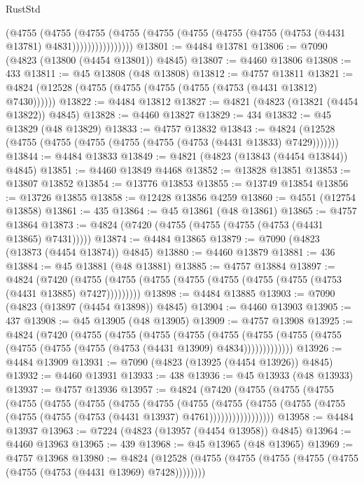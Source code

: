 \begin{lexlean}{RustStd}
\begin{coremodule}
                  (@4755
                    (@4755
                      (@4755
                        (@4755
                          (@4755 (@4755 (@4755 (@4755 (@4753 (@4431 @13781) @4831))))))))))))))))
@13801 := @4484 @13781
@13806 := @7090 (@4823 (@13800 (@4454 @13801)) @4845)
@13807 := @4460 @13806
@13808 := 433
@13811 := @45 @13808 (@48 @13808)
@13812 := @4757 @13811
@13821 := @4824 (@12528 (@4755 (@4755 (@4755 (@4755 (@4753 (@4431 @13812) @7430))))))
@13822 := @4484 @13812
@13827 := @4821 (@4823 (@13821 (@4454 @13822)) @4845)
@13828 := @4460 @13827
@13829 := 434
@13832 := @45 @13829 (@48 @13829)
@13833 := @4757 @13832
@13843 := @4824 (@12528 (@4755 (@4755 (@4755 (@4755 (@4755 (@4753 (@4431 @13833) @7429)))))))
@13844 := @4484 @13833
@13849 := @4821 (@4823 (@13843 (@4454 @13844)) @4845)
@13851 := @4460 @13849 @4468
@13852 := @13828 @13851
@13853 := @13807 @13852
@13854 := @13776 @13853
@13855 := @13749 @13854
@13856 := @13726 @13855
@13858 := @12428 @13856 @4259
@13860 := @4551 (@12754 @13858)
@13861 := 435
@13864 := @45 @13861 (@48 @13861)
@13865 := @4757 @13864
@13873 := @4824 (@7420 (@4755 (@4755 (@4755 (@4753 (@4431 @13865) @7431)))))
@13874 := @4484 @13865
@13879 := @7090 (@4823 (@13873 (@4454 @13874)) @4845)
@13880 := @4460 @13879
@13881 := 436
@13884 := @45 @13881 (@48 @13881)
@13885 := @4757 @13884
@13897 := @4824
    (@7420 (@4755 (@4755 (@4755 (@4755 (@4755 (@4755 (@4755 (@4753 (@4431 @13885) @7427)))))))))
@13898 := @4484 @13885
@13903 := @7090 (@4823 (@13897 (@4454 @13898)) @4845)
@13904 := @4460 @13903
@13905 := 437
@13908 := @45 @13905 (@48 @13905)
@13909 := @4757 @13908
@13925 := @4824
    (@7420
      (@4755
        (@4755
          (@4755
            (@4755
              (@4755
                (@4755 (@4755 (@4755 (@4755 (@4755 (@4755 (@4753 (@4431 @13909) @4834)))))))))))))
@13926 := @4484 @13909
@13931 := @7090 (@4823 (@13925 (@4454 @13926)) @4845)
@13932 := @4460 @13931
@13933 := 438
@13936 := @45 @13933 (@48 @13933)
@13937 := @4757 @13936
@13957 := @4824
    (@7420
      (@4755
        (@4755
          (@4755
            (@4755
              (@4755
                (@4755
                  (@4755
                    (@4755
                      (@4755
                        (@4755
                          (@4755
                            (@4755 (@4755 (@4755 (@4755 (@4753 (@4431 @13937) @4761)))))))))))))))))
@13958 := @4484 @13937
@13963 := @7224 (@4823 (@13957 (@4454 @13958)) @4845)
@13964 := @4460 @13963
@13965 := 439
@13968 := @45 @13965 (@48 @13965)
@13969 := @4757 @13968
@13980 := @4824
    (@12528 (@4755 (@4755 (@4755 (@4755 (@4755 (@4755 (@4753 (@4431 @13969) @7428))))))))

\end{coremodule}
\end{lexlean}
